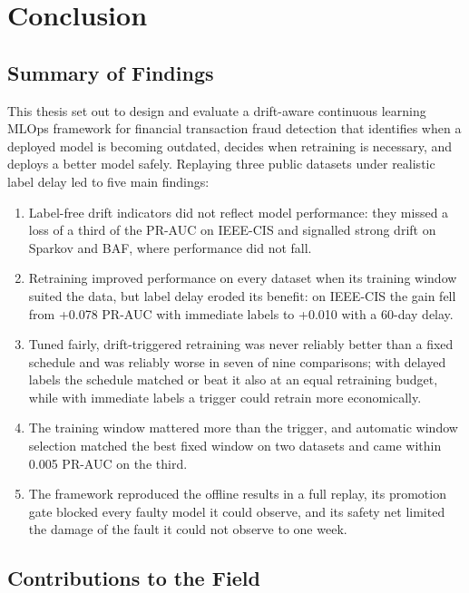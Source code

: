 \chapter{Conclusion}

\section{Summary of Findings}\label{sec:findings}

This thesis set out to design and evaluate a drift-aware continuous learning MLOps framework for financial transaction fraud detection that identifies when a deployed model is becoming outdated, decides when retraining is necessary, and deploys a better model safely. Replaying three public datasets under realistic label delay led to five main findings:

\begin{enumerate}
  \item Label-free drift indicators did not reflect model performance: they missed a loss of a third of the PR-AUC on IEEE-CIS and signalled strong drift on Sparkov and BAF, where performance did not fall.
  \item Retraining improved performance on every dataset when its training window suited the data, but label delay eroded its benefit: on IEEE-CIS the gain fell from +0.078 PR-AUC with immediate labels to +0.010 with a 60-day delay.
  \item Tuned fairly, drift-triggered retraining was never reliably better than a fixed schedule and was reliably worse in seven of nine comparisons; with delayed labels the schedule matched or beat it also at an equal retraining budget, while with immediate labels a trigger could retrain more economically.
  \item The training window mattered more than the trigger, and automatic window selection matched the best fixed window on two datasets and came within 0.005 PR-AUC on the third.
  \item The framework reproduced the offline results in a full replay, its promotion gate blocked every faulty model it could observe, and its safety net limited the damage of the fault it could not observe to one week.
\end{enumerate}

\section{Contributions to the Field}\label{sec:contributions}

